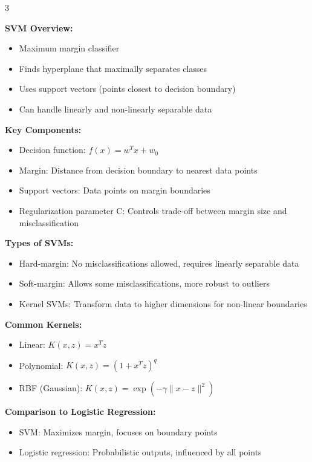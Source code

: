 \documentclass[10pt,landscape]{article}
\begin{document}
\begin{multicols}{3}
\begin{tcolorbox}[breakable, title=4. Support Vector Machines Concepts, colback=svm,boxsep=1pt,left=1pt,right=1pt,top=1pt,bottom=1pt]
\textbf{SVM Overview:}
\begin{itemize}[leftmargin=*,noitemsep,topsep=0pt]
    \item Maximum margin classifier
    \item Finds hyperplane that maximally separates classes
    \item Uses support vectors (points closest to decision boundary)
    \item Can handle linearly and non-linearly separable data
\end{itemize}

\textbf{Key Components:}
\begin{itemize}[leftmargin=*,noitemsep,topsep=0pt]
    \item Decision function: $f(x) = w^Tx + w_0$
    \item Margin: Distance from decision boundary to nearest data points
    \item Support vectors: Data points on margin boundaries
    \item Regularization parameter C: Controls trade-off between margin size and misclassification
\end{itemize}

\textbf{Types of SVMs:}
\begin{itemize}[leftmargin=*,noitemsep,topsep=0pt]
    \item Hard-margin: No misclassifications allowed, requires linearly separable data
    \item Soft-margin: Allows some misclassifications, more robust to outliers
    \item Kernel SVMs: Transform data to higher dimensions for non-linear boundaries
\end{itemize}

\textbf{Common Kernels:}
\begin{itemize}[leftmargin=*,noitemsep,topsep=0pt]
    \item Linear: $K(x,z) = x^Tz$
    \item Polynomial: $K(x,z) = (1 + x^Tz)^q$
    \item RBF (Gaussian): $K(x,z) = \exp(-\gamma\|x-z\|^2)$
\end{itemize}

\textbf{Comparison to Logistic Regression:}
\begin{itemize}[leftmargin=*,noitemsep,topsep=0pt]
    \item SVM: Maximizes margin, focuses on boundary points
    \item Logistic regression: Probabilistic outputs, influenced by all points
\end{itemize}
\end{tcolorbox}


\end{multicols}
\end{document}
